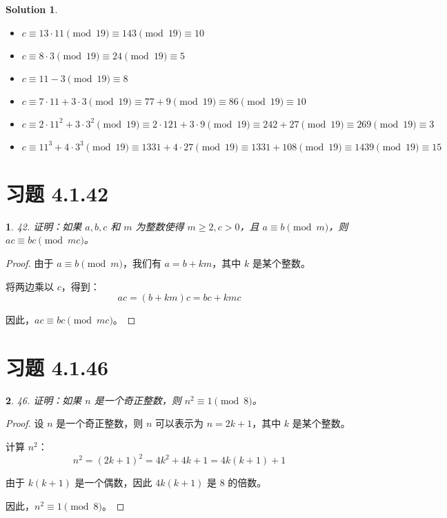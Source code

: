 \documentclass[UTF8]{report}
\newtheorem{solution}{Solution}
\theoremstyle{MyLineTheoremStyle} %
\theoremstyle{MyBlockTheoremStyle} %
\theoremstyle{MySubsubsectionStyle} %
\newtheorem{definition}{}
\begin{document}
\begin{solution}
    \begin{itemize}
        \item[a)] \( c \equiv 13 \cdot 11 \pmod{19} \equiv 143 \pmod{19} \equiv 10 \)
        \item[b)] \( c \equiv 8 \cdot 3 \pmod{19} \equiv 24 \pmod{19} \equiv 5 \)
        \item[c)] \( c \equiv 11 - 3 \pmod{19} \equiv 8 \)
        \item[d)] \( c \equiv 7 \cdot 11 + 3 \cdot 3 \pmod{19} \equiv 77 + 9 \pmod{19} \equiv 86 \pmod{19} \equiv 10 \)
        \item[e)] \( c \equiv 2 \cdot 11^2 + 3 \cdot 3^2 \pmod{19} \equiv 2 \cdot 121 + 3 \cdot 9 \pmod{19} \equiv 242 + 27 \pmod{19} \equiv 269 \pmod{19} \equiv 3 \)
        \item[f)] \( c \equiv 11^3 + 4 \cdot 3^3 \pmod{19} \equiv 1331 + 4 \cdot 27 \pmod{19} \equiv 1331 + 108 \pmod{19} \equiv 1439 \pmod{19} \equiv 15 \)
    \end{itemize}
\end{solution}

\section{习题 4.1.42}

\begin{definition}
    42. 证明：如果 \( a, b, c \) 和 \( m \) 为整数使得 \( m \geq 2, c > 0 \)，且 \( a \equiv b \pmod{m} \)，则 \( ac \equiv bc \pmod{mc} \)。
\end{definition}

\begin{proof}
    由于 \( a \equiv b \pmod{m} \)，我们有 \( a = b + km \)，其中 \( k \) 是某个整数。

    将两边乘以 \( c \)，得到：
    \[
    ac = (b + km)c = bc + kmc
    \]

    因此，\( ac \equiv bc \pmod{mc} \)。
\end{proof}

\section{习题 4.1.46}

\begin{definition}
    46. 证明：如果 \( n \) 是一个奇正整数，则 \( n^2 \equiv 1 \pmod{8} \)。
\end{definition}

\begin{proof}
    设 \( n \) 是一个奇正整数，则 \( n \) 可以表示为 \( n = 2k + 1 \)，其中 \( k \) 是某个整数。

    计算 \( n^2 \)：
    \[
    n^2 = (2k + 1)^2 = 4k^2 + 4k + 1 = 4k(k + 1) + 1
    \]

    由于 \( k(k + 1) \) 是一个偶数，因此 \( 4k(k + 1) \) 是 8 的倍数。

    因此，\( n^2 \equiv 1 \pmod{8} \)。
\end{proof}
\end{document}
